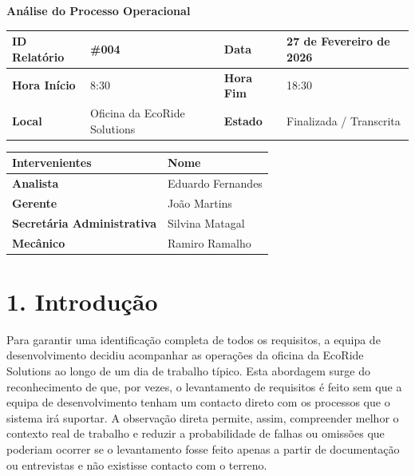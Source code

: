 \documentclass[11pt,a4paper]{article}
\begin{document}
	
	{\noindent\LARGE\bfseries\color{primaryblue} Análise do Processo Operacional}
	\\[0.5cm]
	
	\renewcommand{\arraystretch}{1.5}
	\begin{tabularx}{\textwidth}{@{}|l|X|l|X|@{}}
		\hline
		\rowcolor{gray!10} \textbf{ID Relatório} & \#004 & \textbf{Data} & 27 de Fevereiro de 2026 \\ \hline
		\textbf{Hora Início} & 8:30 & \textbf{Hora Fim} & 18:30 \\ \hline
		\textbf{Local} & Oficina da EcoRide Solutions & \textbf{Estado} & Finalizada / Transcrita \\ \hline
	\end{tabularx}
	
	\vspace{0.5cm}
	
	\begin{tabularx}{\textwidth}{@{}|l|X|@{}}
		\hline
		\rowcolor{gray!10} \textbf{Intervenientes} & \textbf{Nome} \\ \hline
		\textbf{Analista} & Eduardo Fernandes \\ \hline
		\textbf{Gerente} & João Martins \\ \hline
		\textbf{Secretária Administrativa} & Silvina Matagal \\ \hline
		\textbf{Mecânico} & Ramiro Ramalho  \\ \hline
	\end{tabularx}
	
	\vspace{0.8cm}
	
	\section*{1. Introdução}
	Para garantir uma identificação completa de todos os requisitos, a equipa de desenvolvimento decidiu acompanhar as operações da oficina da EcoRide Solutions ao longo de um dia de trabalho típico. Esta abordagem surge do reconhecimento de que, por vezes, o levantamento de requisitos é feito sem que a equipa de desenvolvimento tenham um contacto direto com os processos que o sistema irá suportar. A observação direta permite, assim, compreender melhor o contexto real de trabalho e reduzir a probabilidade de falhas ou omissões que poderiam ocorrer se o levantamento fosse feito apenas a partir de documentação ou entrevistas e não existisse contacto com o terreno.
	
\end{document}
